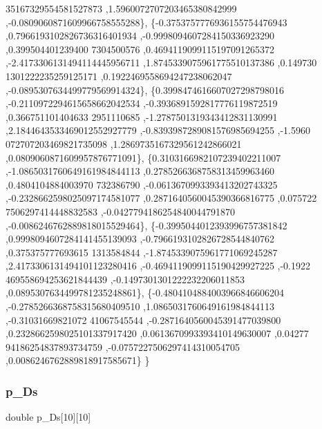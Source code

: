 \begin{DoxyCode}
      35167329554581527873 ,1.5960072707203465380842999 ,-0.0809060871609966758555288\},
\{-0.3753757776936155754476943 ,0.7966193102826736316401934 ,-0.9998094607284150336923290 ,0.399504401239400
      7304500576 ,0.4694119099115197091265372 ,-2.4173306131494114445956711 ,1.8745339075961775510137386 ,0.149730
      1301222235259125171 ,0.1922469558694247238062047 ,-0.0895307634499779569914324\},
\{0.3998474616607027298798016 ,-0.2110972294615658662042534 ,-0.3936891592817776119872519 ,0.366751101404633
      2951110685 ,-1.2787501319343412831130991 ,2.1844643533469012552927779 ,-0.8393987289081576985694255 ,-1.5960
      072707203469821735098 ,1.2869735167329561242866021 ,0.0809060871609957876771091\},
\{0.3103166982107239402211007 ,-1.0865031760649161984844113 ,0.2785266368758313459963460 ,0.4804104884003970
      732386790 ,-0.0613670993393413202743325 ,-0.2328662598025097174581077 ,0.2871640560045390366816775 ,0.075722
      7506297414448832583 ,-0.0427794186254840044791870 ,-0.0086246762889818015529464\},
\{-0.3995044012393996757381842 ,0.9998094607284141455139093 ,-0.7966193102826728544840762 ,0.375375777693615
      1313584844 ,-1.8745339075961771069245287 ,2.4173306131494101123280416 ,-0.4694119099115190429927225 ,-0.1922
      469558694253621844439 ,-0.1497301301222232206011853 ,0.0895307634499781235248861\},
\{-0.4804104884003966846606204 ,-0.2785266368758315680409510 ,1.0865031760649161984844113 ,-0.31031669821072
      41067545544 ,-0.2871640560045391477039800 ,0.2328662598025101337917420 ,0.0613670993393410149630007 ,0.04277
      94186254837893734759 ,-0.0757227506297414310054705 ,0.0086246762889818917585671\}
\}
\end{DoxyCode}
\mbox{\label{a00993_ada19a548901d8b04fd5c62d0e30d53f7}} 
\subsubsection{\texorpdfstring{p\+\_\+\+Ds}{p\_Ds}}
{\footnotesize\ttfamily double p\+\_\+\+Ds\mbox{[}10\mbox{]}\mbox{[}10\mbox{]}}

